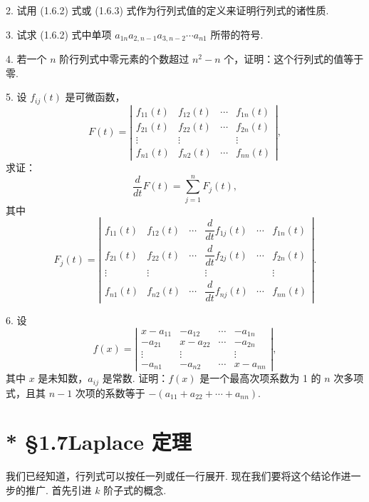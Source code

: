 \documentclass[UTF8, 12pt, fontset=fandol, oneside]{ctexart}
\begin{document}
2. 试用 (1.6.2) 式或 (1.6.3) 式作为行列式值的定义来证明行列式的诸性质.

3. 试求 (1.6.2) 式中单项 $a_{1n}a_{2,n-1}a_{3,n-2}\cdots a_{n1}$ 所带的符号.

4. 若一个 $n$ 阶行列式中零元素的个数超过 $n^2-n$ 个，证明：这个行列式的值等于零.

5. 设 $f_{ij}(t)$ 是可微函数，
\[
F(t)=
\left|\begin{array}{cccc}
f_{11}(t) & f_{12}(t) & \cdots & f_{1n}(t)\\
f_{21}(t) & f_{22}(t) & \cdots & f_{2n}(t)\\
\vdots & \vdots & & \vdots\\
f_{n1}(t) & f_{n2}(t) & \cdots & f_{nn}(t)
\end{array}\right|,
\]
求证：
\[
\frac{d}{dt}F(t)=\sum_{j=1}^n F_j(t),
\]
其中
\[
F_j(t)=
\left|\begin{array}{ccccccc}
f_{11}(t) & f_{12}(t) & \cdots & \dfrac{d}{dt}f_{1j}(t) & \cdots & f_{1n}(t)\\
f_{21}(t) & f_{22}(t) & \cdots & \dfrac{d}{dt}f_{2j}(t) & \cdots & f_{2n}(t)\\
\vdots & \vdots & & \vdots & & \vdots\\
f_{n1}(t) & f_{n2}(t) & \cdots & \dfrac{d}{dt}f_{nj}(t) & \cdots & f_{nn}(t)
\end{array}\right|.
\]

6. 设
\[
f(x)=
\left|\begin{array}{cccc}
x-a_{11} & -a_{12} & \cdots & -a_{1n}\\
-a_{21} & x-a_{22} & \cdots & -a_{2n}\\
\vdots & \vdots & & \vdots\\
-a_{n1} & -a_{n2} & \cdots & x-a_{nn}
\end{array}\right|,
\]
其中 $x$ 是未知数，$a_{ij}$ 是常数. 证明：$f(x)$ 是一个最高次项系数为 1 的 $n$ 次多项式，且其 $n-1$ 次项的系数等于 $-(a_{11}+a_{22}+\cdots+a_{nn})$.

\section*{* §1.7\quad Laplace 定理}

我们已经知道，行列式可以按任一列或任一行展开. 现在我们要将这个结论作进一步的推广. 首先引进 $k$ 阶子式的概念.
\end{document}

